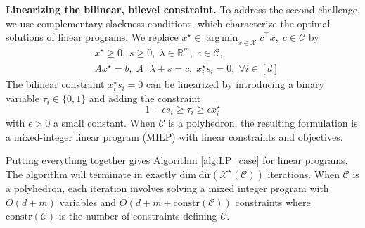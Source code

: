 \documentclass[11pt]{article}
\theoremstyle{plain}
\theoremstyle{definition}
\renewcommand{\dim}[0]{\mathrm{dim}\;}
\newcommand{\Vect}{\mathrm{span}~}
\newcommand{\proj}[2]{\mathrm{proj}_{#1}\left(#2\right)}
\newcommand{\dualpoly}[2]{#1^\star\left(#2\right)}
\newcommand{\Prob}{{\rm{Prob}}}
\newcommand{\cX}{\mathcal{X}}
\newcommand{\cC}{\mathcal{C}}
\newcommand{\cD}{\mathcal{D}}
\renewcommand{\Re}{\mathbb{R}}
\DeclareMathOperator*{\argmin}{arg\,min}
\newcommand{\dir}[1]{\mathrm{dir}\left(#1\right)}
\begin{document}

\textbf{Linearizing the bilinear, bilevel constraint.}
To address the second challenge, we use complementary slackness conditions, which characterize the optimal solutions of linear programs. We replace $x^\star \in \argmin_{x \in \cX} c^\top x, \; c \in \cC$ by
\begin{align*}
    &x^\star \geq 0, \; s \geq 0, \; \lambda \in \Re^m, \; c \in \cC,\\
    &Ax^\star = b, \; A^\top \lambda + s = c, \; x^\star_is_i = 0, \; \forall i \in [d] 
\end{align*}
The bilinear constraint $x^\star_is_i = 0$ can be linearized by introducing a binary variable $\tau_i \in \{0,1\}$ and adding the constraint
$$
1- \epsilon s_i \geq \tau_i \geq \epsilon x^\star_i
$$
with $\epsilon>0$ a small constant. When \(\mathcal{C}\) is a polyhedron, the resulting formulation is a mixed-integer linear program (MILP) with linear constraints and objectives.

Putting everything together gives Algorithm \ref{alg:LP_case} for linear programs. The algorithm will terminate in exactly $\dim \dir{\dualpoly{\cX}{\cC}}$ iterations. When $\cC$ is a polyhedron, each iteration involves solving a mixed integer program with $O(d+m)$ variables and $O(d+m + \mathrm{constr}(\cC))$ constraints where $\mathrm{constr}(\cC)$ is the number of constraints defining $\cC$. 
\end{document}
